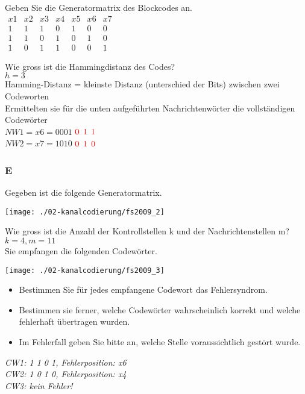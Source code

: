 Geben Sie die Generatormatrix des Blockcodes an.\\
$\begin{matrix}
    x1 & x2 & x3 & x4 & x5 & x6 & x7\\
    1 & 1 & 1 & 0 & 1 & 0 & 0\\
    1 & 1 & 0 & 1 & 0 & 1 & 0\\
    1 & 0 & 1 & 1 & 0 & 0 & 1
\end{matrix}$

Wie gross ist die Hammingdistanz des Codes?\\
$h=3$\\
Hamming-Distanz = kleinste Distanz (unterschied der Bits) zwischen zwei Codeworten\\

Ermittelten sie für die unten aufgeführten Nachrichtenwörter die vollständigen Codewörter\\
$NW1 = x6 = 0001$ $\textcolor{red}{0}$ $\textcolor{red}{1}$ $\textcolor{red}{1}$\\
$NW2 = x7 = 1010$ $\textcolor{red}{0}$ $\textcolor{red}{1}$ $\textcolor{red}{0}$

\subsubsection{E}
Gegeben ist die folgende Generatormatrix.
\begin{center}
    \vspace{-8pt}
    \texttt{[image: ./02-kanalcodierung/fs2009\_2]}
    \vspace{-8pt}
\end{center}

Wie gross ist die Anzahl der Kontrollstellen k und der Nachrichtenstellen m?\\
$k=4, m=11$\\

Sie empfangen die folgenden Codewörter.
\begin{center}
    \vspace{-8pt}
    \texttt{[image: ./02-kanalcodierung/fs2009\_3]}
    \vspace{-8pt}
\end{center}

\begin{itemize}
    \item Bestimmen Sie für jedes empfangene Codewort das Fehlersyndrom.
    \item Bestimmen sie ferner, welche Codewörter wahrscheinlich korrekt und welche fehlerhaft übertragen wurden.
    \item Im Fehlerfall geben Sie bitte an, welche Stelle voraussichtlich gestört wurde.
\end{itemize}
\textit{CW1: 1 1 0 1, Fehlerposition: x6}\\
\textit{CW2: 1 0 1 0, Fehlerposition: x4}\\
\textit{CW3: kein Fehler!}\\


